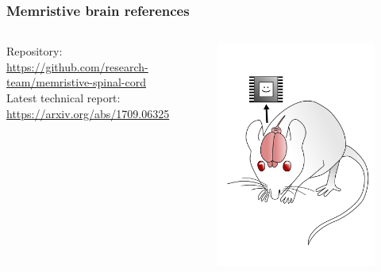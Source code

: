 \documentclass[12pt, aspectratio=169]{beamer}
\begin{document}
\begin{frame}
  \frametitle{Memristive brain references}
\begin{columns}[c]

Repository:\\
\url{https://github.com/research-team/memristive-spinal-cord}\\


Latest technical report:\\
\url{https://arxiv.org/abs/1709.06325}

\begin{figure}
\includegraphics[width=1.0\linewidth]{mousebrainpink}
\end{figure}
\end{columns}
\end{frame}
\end{document}
